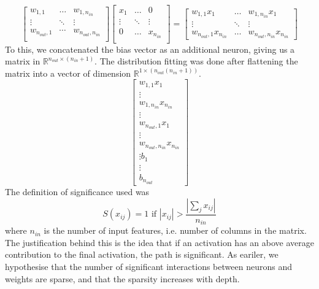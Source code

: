 \documentclass{article}
\begin{document}
                \[
                    \begin{bmatrix}
                        w_{1,1} & \dots & w_{1,n_{in}} \\
                        \vdots & \ddots & \vdots \\
                        w_{n_{out}, 1} & \cdots & w_{n_{out}, n_{in}} \\
                    \end{bmatrix}
                    \begin{bmatrix}
                        x_1  & \dots & 0 \\
                        \vdots & \ddots & \vdots \\
                        0 & \dots & x_{n_{in}} \\
                    \end{bmatrix}
                    = 
                    \begin{bmatrix}
                        w_{1,1}x_1  & \dots & w_{1,n_{in}}x_1 \\
                        \vdots & \ddots & \vdots \\
                        w_{n_{out}, 1}x_{n_{in}} & \dots & w_{n_{out}, n_{in}}x_{n_{in}} 
                    \end{bmatrix}\]
            To this, we concatenated the bias vector as an additional neuron, giving us a matrix in $\mathbb{R}^{n_{out} \times (n_{in} + 1)}$. The distribution fitting was done after flattening the matrix into a vector of dimension $\mathbb{R}^{1 \times (n_{out}(n_{in} + 1))}$. 
            \[\begin{bmatrix}
                    w_{1,1}x_1 \\
                    \vdots \\
                    w_{1,n_{in}}x_{n_{in}} \\
                    \vdots \\
                    w_{n_{out},1}x_{1} \\
                    \vdots \\
                    w_{n_{out}, n_{in}}x_{n_{in}} \\
                    \vdots
                    b_1 \\
                    \vdots \\
                    b_{n_{out}}
                \end{bmatrix}\]
            The definition of significance used was 
            \[S(x_{ij}) = 1 \text{ if } |x_{ij}| > \frac{|\sum_j x_{ij}|}{n_{in}} \]
            where $n_{in}$ is the number of input features, i.e. number of columns in the matrix. The justification behind this is the idea that if an activation has an above average contribution to the final activation, the path is significant.
            As eariler, we hypothesise that the number of significant interactions between neurons and weights are sparse, and that the sparsity increases with depth. 
            
\end{document}
